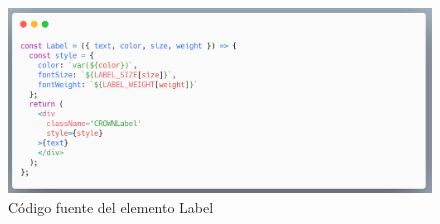 \newline
\begin{figure}[H]
    \includegraphics[width=1\textwidth]{./Imagenes/carbon-11.png}
    \caption[Código fuente del elemento Label]{Código fuente del elemento Label}
    \end{figure}
\newline
\newline
\clearpage


